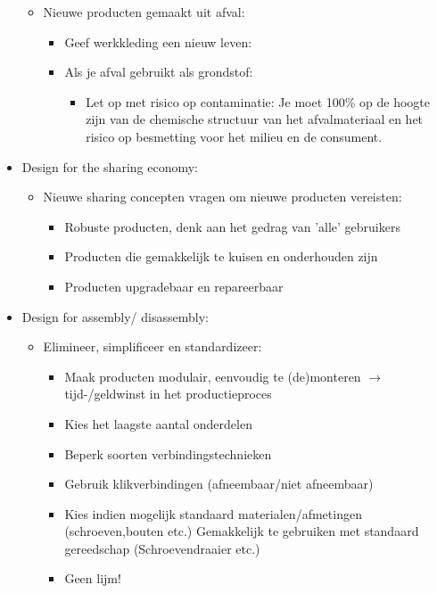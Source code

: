 \documentclass[12pt]{article}
\begin{document}
\begin{itemize}
\begin{itemize}
        \item Nieuwe producten gemaakt uit afval:\begin{itemize}
            \item Geef werkkleding een nieuw leven:
            \item Als je afval gebruikt als grondstof:\begin{itemize}
                \item Let op met risico op contaminatie: Je moet 100\% op de hoogte zijn van de chemische structuur van het afvalmateriaal en het risico op besmetting voor het milieu en de consument.
            \end{itemize}
        \end{itemize}
    \end{itemize}
    \item Design for the sharing economy:\begin{itemize}
        \item Nieuwe sharing concepten vragen om nieuwe producten vereisten:\begin{itemize}
            \item Robuste producten, denk aan het gedrag van 'alle' gebruikers
            \item Producten die gemakkelijk te kuisen en onderhouden zijn 
            \item Producten upgradebaar en repareerbaar
        \end{itemize}
    \end{itemize}
    \item Design for assembly/ disassembly:\begin{itemize}
        \item Elimineer, simplificeer en standardizeer:\begin{itemize}
            \item Maak producten modulair, eenvoudig te (de)monteren $\rightarrow$ tijd-/geldwinst in het productieproces 
            \item Kies het laagste aantal onderdelen 
            \item Beperk soorten verbindingstechnieken 
            \item Gebruik klikverbindingen (afneembaar/niet afneembaar) 
            \item Kies indien mogelijk standaard materialen/afmetingen (schroeven,bouten etc.) Gemakkelijk te gebruiken met standaard gereedschap (Schroevendraaier etc.)
            \item Geen lijm!

\end{itemize}
\end{itemize}
\end{itemize}
\end{document}
